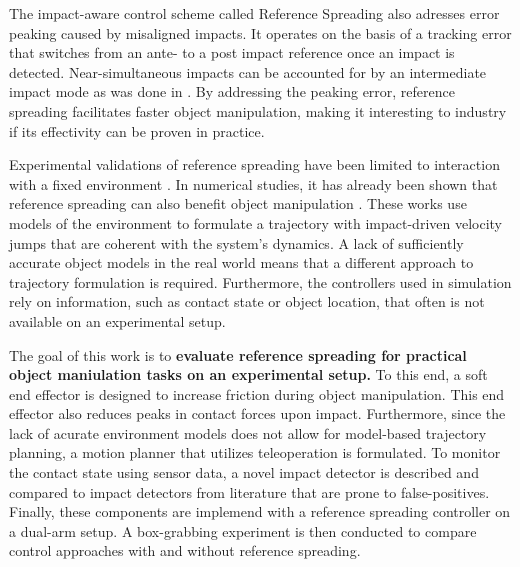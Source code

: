 \documentclass[a4paper, 10pt, conference]{ieeeconf}
\begin{document}
    The impact-aware control scheme called Reference Spreading \cite{sacconSensitivityAnalysisHybrid2014} also adresses error peaking caused by misaligned impacts. It operates on the basis of a tracking error that switches from an ante- to a post impact reference once an impact is detected. Near-simultaneous impacts can be accounted for by an intermediate impact mode as was done in \cite{vansteenRobotControlSimultaneous2021}. By addressing the peaking error, reference spreading facilitates faster object manipulation, making it interesting to industry if its effectivity can be proven in practice. 

    Experimental validations of reference spreading have been limited to interaction with a fixed environment \cite{rijnenReferenceSpreadingTracking2020,uitendaalTeachingRobotsInteraction2022}. In numerical studies, it has already been shown that reference spreading can also benefit object manipulation \cite{vansteenRobotControlSimultaneous2021,zwartImpactAwareLearningDemonstration2019}. These works use models of the environment to formulate a trajectory with impact-driven velocity jumps that are coherent with the system's dynamics. A lack of sufficiently accurate object models in the real world means that a different approach to trajectory formulation is required. Furthermore, the controllers used in simulation rely on information, such as contact state or object location, that often is not available on an experimental setup.

    The goal of this work is to \textbf{evaluate reference spreading for practical object maniulation tasks on an experimental setup.} To this end, a soft end effector is designed to increase friction during object manipulation. This end effector also reduces peaks in contact forces upon impact. Furthermore, since the lack of acurate environment models does not allow for model-based trajectory planning, a motion planner that utilizes teleoperation is formulated. To monitor the contact state using sensor data, a novel impact detector is described and compared to impact detectors from literature that are prone to false-positives. Finally, these components are implemend with a reference spreading controller on a dual-arm setup. A box-grabbing experiment is then conducted to compare control approaches with and without reference spreading.
\end{document}
